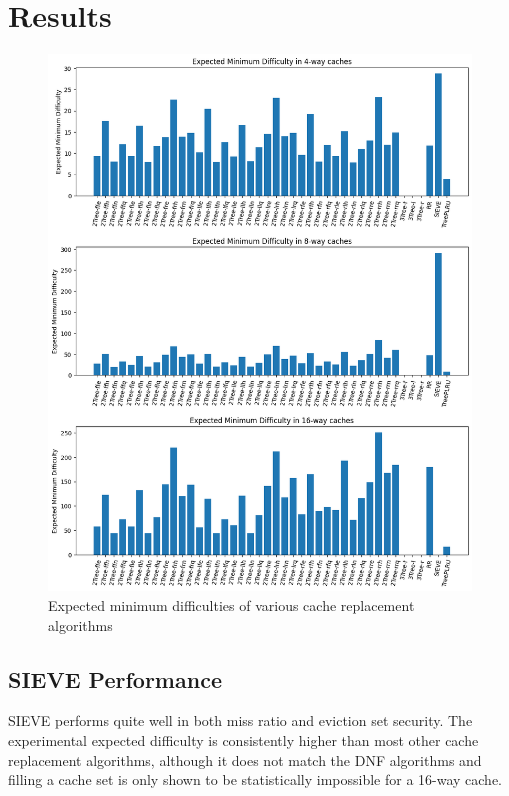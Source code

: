 \documentclass[letterpaper]{article}
\begin{document}
\section{Results}

\begin{figure}
	\begin{center}
		\includegraphics[scale=0.45]{minimum_difficulty}
	\end{center}
  \caption{Expected minimum difficulties of various cache replacement algorithms}
  \label{fig:expected_difficulties}
\end{figure}

\subsection{SIEVE Performance}


SIEVE performs quite well in both miss ratio and eviction set security.
The experimental expected difficulty is consistently higher than most other cache replacement algorithms,
although it does not match the DNF algorithms and filling a cache set
is only shown to be statistically impossible for a 16-way cache.
\end{document}
